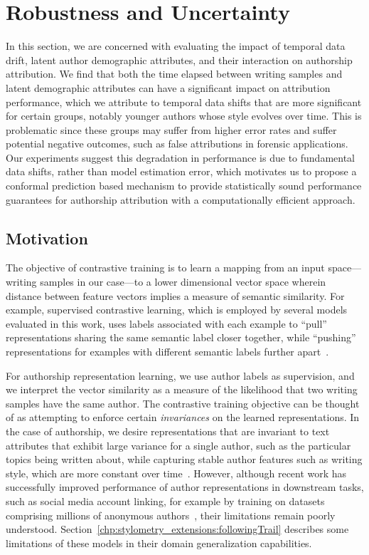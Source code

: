\section{Robustness and Uncertainty}

In this section, we are concerned with evaluating the impact of temporal data drift, latent author demographic attributes, and their interaction on authorship attribution.
We find that both the time elapsed between writing samples and latent demographic attributes can have a significant impact on attribution performance, which we attribute to temporal data shifts that are more significant for certain groups, notably younger authors whose style evolves over time.
This is problematic since these groups may suffer from higher error rates and suffer potential negative outcomes, such as false attributions in forensic applications.
Our experiments suggest this degradation in performance is due to fundamental data shifts, rather than model estimation error, which motivates us to propose a conformal prediction based mechanism to provide statistically sound performance guarantees for authorship attribution with a computationally efficient approach.

\subsection{Motivation}

The objective of contrastive training is to learn a mapping from an input space---writing samples in our case---to a lower dimensional vector space wherein distance between feature vectors implies a measure of semantic similarity. 
For example, supervised contrastive learning, which is employed by several models evaluated in this work, uses labels associated with each example to ``pull'' representations sharing the same semantic label closer together, while ``pushing'' representations for examples with different semantic labels further apart~\cite{khosla2020supervised}. 

For authorship representation learning, we use author labels as supervision, and we interpret the vector similarity as a measure of the likelihood that two writing samples have the same author. 
The contrastive training objective can be thought of as attempting to enforce certain \emph{invariances} on the learned representations.
In the case of authorship, we desire representations that are invariant to text attributes that exhibit large variance for a single author, such as the particular topics being written about, while capturing stable author features such as writing style, which are more constant over time~\cite{andrews2019learning}.
However, although recent work has successfully improved performance of author representations in downstream tasks, such as social media account linking, for example by training on datasets comprising millions of anonymous authors~\cite{khan2021deep}, their limitations remain poorly understood. 
Section~\ref{chp:stylometry_extensions:followingTrail} describes some limitations of these models in their domain generalization capabilities.


